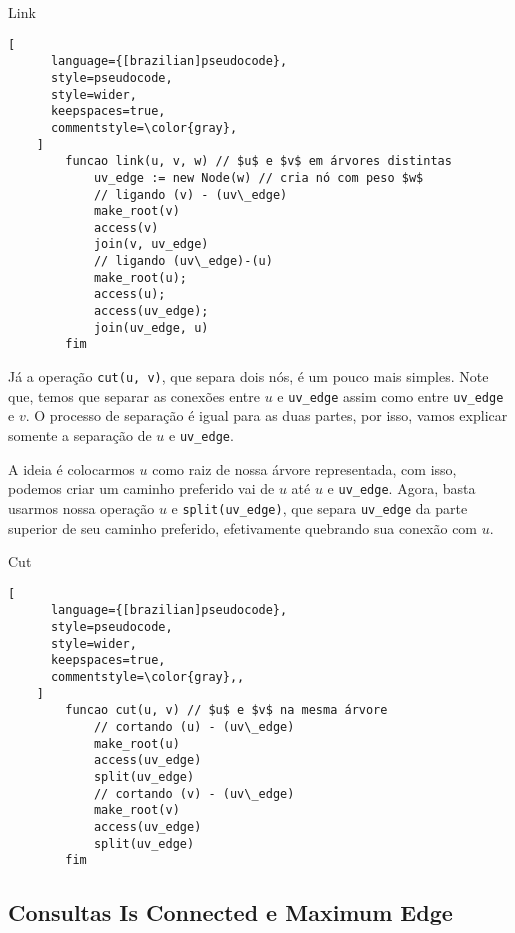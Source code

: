 \begin{programruledcaption}{Link\label{lct:link}}
    \begin{lstlisting}[
      language={[brazilian]pseudocode},
      style=pseudocode,
      style=wider,
      keepspaces=true,
      commentstyle=\color{gray},
    ]   
        funcao link(u, v, w) // $u$ e $v$ em árvores distintas
            uv_edge := new Node(w) // cria nó com peso $w$
            // ligando (v) - (uv\_edge)
            make_root(v)
            access(v)
            join(v, uv_edge)
            // ligando (uv\_edge)-(u)
            make_root(u);
            access(u);
            access(uv_edge);
            join(uv_edge, u)
        fim
    \end{lstlisting}
\end{programruledcaption}


Já a operação \texttt{cut(u, v)}, que separa dois nós, é um pouco mais simples. Note que, temos que separar as conexões entre $u$ e \texttt{uv\_edge} assim como entre \texttt{uv\_edge} e $v$. O processo de separação é igual para as duas partes, por isso, vamos explicar somente a separação de $u$ e \texttt{uv\_edge}.

A ideia é colocarmos $u$ como raiz de nossa árvore representada, com isso, podemos criar um caminho preferido vai de $u$ até $u$ e \texttt{uv\_edge}. Agora, basta usarmos nossa operação $u$ e \texttt{split(uv\_edge)}, que separa \texttt{uv\_edge} da parte superior de seu caminho preferido, efetivamente quebrando sua conexão com $u$.

\begin{programruledcaption}{Cut\label{lct:cut}}
    \begin{lstlisting}[
      language={[brazilian]pseudocode},
      style=pseudocode,
      style=wider,
      keepspaces=true,
      commentstyle=\color{gray},,
    ]
        funcao cut(u, v) // $u$ e $v$ na mesma árvore
            // cortando (u) - (uv\_edge)
            make_root(u)
            access(uv_edge)
            split(uv_edge)
            // cortando (v) - (uv\_edge)
            make_root(v)
            access(uv_edge)
            split(uv_edge)
        fim
    \end{lstlisting}
\end{programruledcaption}

\subsection{Consultas Is Connected e Maximum Edge}
\label{subsection:lct-is-connected}

